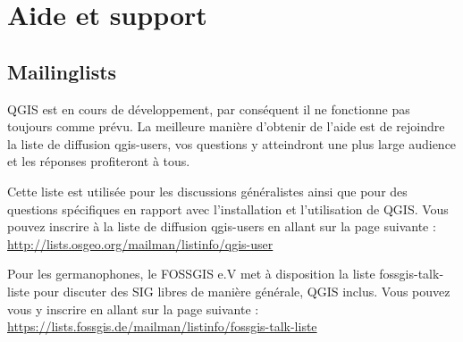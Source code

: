 
\section{Aide et support}\label{label_helpsupport}

\subsection{Mailinglists}
QGIS est en cours de développement, par conséquent il ne fonctionne pas toujours comme prévu. La meilleure manière d'obtenir de l'aide est de rejoindre la liste de diffusion qgis-users, vos questions y atteindront une plus large audience et les réponses profiteront à tous.

Cette liste est utilisée pour les discussions généralistes ainsi que pour des questions spécifiques en rapport avec l'installation et l'utilisation de QGIS. Vous pouvez inscrire à la liste de diffusion qgis-users en allant sur la page suivante : \\
\url{http://lists.osgeo.org/mailman/listinfo/qgis-user}

Pour les germanophones, le FOSSGIS e.V met à disposition la liste fossgis-talk-liste pour discuter des SIG libres de manière générale, QGIS inclus. Vous pouvez vous y inscrire en allant sur la page suivante : \\
\url{https://lists.fossgis.de/mailman/listinfo/fossgis-talk-liste}

